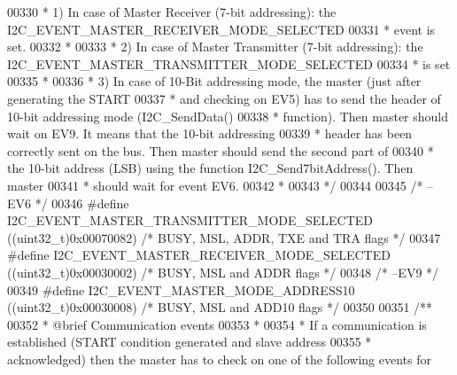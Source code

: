 \begin{DoxyCode}
00330 \textcolor{comment}{  *  1) In case of Master Receiver (7-bit addressing): the I2C\_EVENT\_MASTER\_RECEIVER\_MODE\_SELECTED }
00331 \textcolor{comment}{  *     event is set.}
00332 \textcolor{comment}{  *  }
00333 \textcolor{comment}{  *  2) In case of Master Transmitter (7-bit addressing): the
       I2C\_EVENT\_MASTER\_TRANSMITTER\_MODE\_SELECTED }
00334 \textcolor{comment}{  *     is set}
00335 \textcolor{comment}{  *  }
00336 \textcolor{comment}{  *  3) In case of 10-Bit addressing mode, the master (just after generating the START }
00337 \textcolor{comment}{  *  and checking on EV5) has to send the header of 10-bit addressing mode (I2C\_SendData() }
00338 \textcolor{comment}{  *  function). Then master should wait on EV9. It means that the 10-bit addressing }
00339 \textcolor{comment}{  *  header has been correctly sent on the bus. Then master should send the second part of }
00340 \textcolor{comment}{  *  the 10-bit address (LSB) using the function I2C\_Send7bitAddress(). Then master }
00341 \textcolor{comment}{  *  should wait for event EV6. }
00342 \textcolor{comment}{  *     }
00343 \textcolor{comment}{  */}
00344 
00345 \textcolor{comment}{/* --EV6 */}
00346 \textcolor{preprocessor}{#}\textcolor{preprocessor}{define}  \textcolor{preprocessor}{I2C\_EVENT\_MASTER\_TRANSMITTER\_MODE\_SELECTED}        \textcolor{preprocessor}{(}\textcolor{preprocessor}{(}\textcolor{preprocessor}{uint32\_t}\textcolor{preprocessor}{)}0x00070082\textcolor{preprocessor}{)}  \textcolor{comment}{/* BUSY, MSL, ADDR,
       TXE and TRA flags */}
00347 \textcolor{preprocessor}{#}\textcolor{preprocessor}{define}  \textcolor{preprocessor}{I2C\_EVENT\_MASTER\_RECEIVER\_MODE\_SELECTED}           \textcolor{preprocessor}{(}\textcolor{preprocessor}{(}\textcolor{preprocessor}{uint32\_t}\textcolor{preprocessor}{)}0x00030002\textcolor{preprocessor}{)}  \textcolor{comment}{/* BUSY, MSL and
       ADDR flags */}
00348 \textcolor{comment}{/* --EV9 */}
00349 \textcolor{preprocessor}{#}\textcolor{preprocessor}{define}  \textcolor{preprocessor}{I2C\_EVENT\_MASTER\_MODE\_ADDRESS10}                   \textcolor{preprocessor}{(}\textcolor{preprocessor}{(}\textcolor{preprocessor}{uint32\_t}\textcolor{preprocessor}{)}0x00030008\textcolor{preprocessor}{)}  \textcolor{comment}{/* BUSY, MSL and
       ADD10 flags */}
00350 
00351 \textcolor{comment}{/** }
00352 \textcolor{comment}{  * @brief Communication events}
00353 \textcolor{comment}{  * }
00354 \textcolor{comment}{  * If a communication is established (START condition generated and slave address }
00355 \textcolor{comment}{  * acknowledged) then the master has to check on one of the following events for }

\end{DoxyCode}
